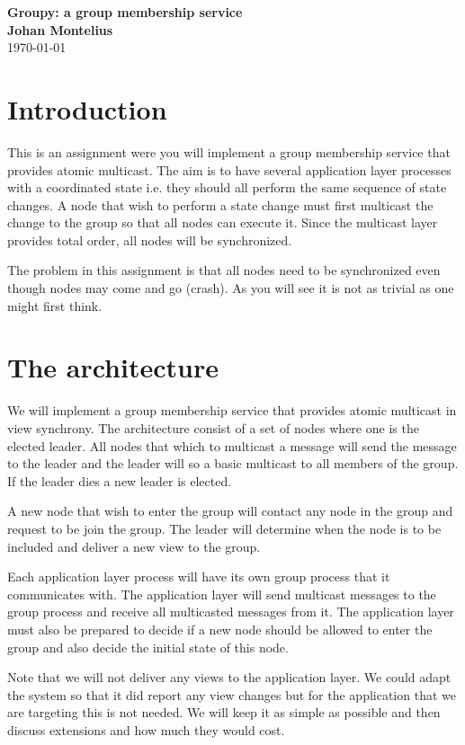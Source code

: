 \documentclass[a4paper,11pt]{article}
\newcommand{\nnsection}[1]{
\section*{#1}
\addcontentsline{toc}{section}{#1}
}
\begin{document}
\begin{center}
\vspace{20pt}
\textbf{\large Groupy: a group membership service}\\
\vspace{10pt}
\textbf{Johan Montelius}\\
\vspace{10pt}
\today{}
\end{center}

\nnsection{Introduction}

This is an assignment were you will implement a group membership
service that provides atomic multicast. The aim is to have several
application layer processes with a coordinated state i.e. they should all
perform the same sequence of state changes. A node that wish to
perform a state change must first multicast the change to the group
so that all nodes can execute it. Since the multicast layer provides
total order, all nodes will be synchronized.

The problem in this assignment is that all nodes need to be
synchronized even though nodes may come and go (crash). As you will
see it is not as trivial as one might first think.


\section{The architecture}

We will implement a group membership service that provides atomic
multicast in view synchrony. The architecture consist of a set of nodes
where one is the elected leader. All nodes that which to multicast a
message will send the message to the leader and the leader will so a
basic multicast to all members of the group. If the leader dies a new
leader is elected.

A new node that wish to enter the group will contact any node in the
group and request to be join the group. The leader will determine
when the node is to be included and deliver a new view to the
group. 

Each application layer process will have its own group process that it
communicates with. The application layer will send multicast messages to the
group process and receive all multicasted messages from it. The application
layer must also be prepared to decide if a new node should be allowed
to enter the group and also decide the initial state of this node. 

Note that we will not deliver any views to the application layer. We
could adapt the system so that it did report any view changes but for
the application that we are targeting this is not needed. We will keep
it as simple as possible and then discuss extensions and how much they
would cost.
\end{document}
